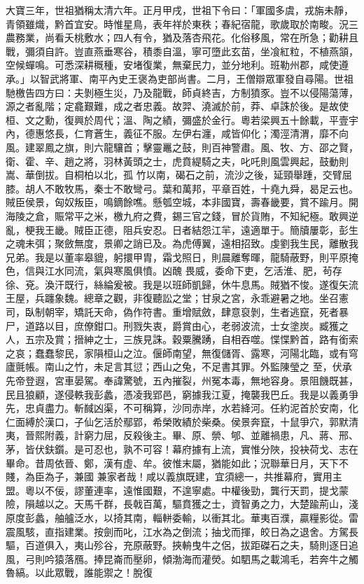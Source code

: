 \begin{pinyinscope}
 大寶三年，世祖猶稱太清六年。正月甲戌，世祖下令曰：「軍國多虞，戎旃未靜，青領雖熾，黔首宜安。時惟星鳥，表年祥於東秩；春紀宿龍，歌歲取於南畯。況三農務業，尚看夭桃敷水；四人有令，猶及落杏飛花。化俗移風，常在所急；勸耕且戰，彌須自許。豈直燕垂寒谷，積黍自溫，寧可墮此玄苗，坐飡紅粒，不植燕頷，空候蟬鳴。可悉深耕穊種，安堵復業，無棄民力，並分地利。班勒州郡，咸使遵
 承。」以智武將軍、南平內史王褒為吏部尚書。二月，王僧辯眾軍發自尋陽。世祖馳檄告四方曰：夫剝極生災，乃及龍戰，師貞終吉，方制獖豕。豈不以侵陽蕩薄，源之者亂階；定龕艱難，成之者忠義。故羿、澆滅於前，莽、卓誅於後。是故使桓、文之勳，復興於周代；溫、陶之績，彌盛於金行。粵若梁興五十餘載，平壹宇內，德惠悠長，仁育蒼生，義征不服。左伊右瀍，咸皆仰化；濁涇清渭，靡不向風。建翠鳳之旗，則六龍驤首；擊靈鼉之鼓，則百神警肅。風、牧、方、邵之賢，衛、霍、辛、趙之將，羽林黃頭之士，虎賁緹騎之夫，叱吒則風雲興起，鼓動則嵩、華倒拔。自桐柏以北，孤
 竹以南，碣石之前，流沙之後，延頸舉踵，交臂屈膝。胡人不敢牧馬，秦士不敢彎弓。葉和萬邦，平章百姓，十堯九舜，曷足云也。賊臣侯景，匈奴叛臣，鳴鏑餘噍。懸瓠空城，本非國寶，壽春畿要，賞不踰月。開海陵之倉，賑常平之米，檄九府之費，錫三官之錢，冒於貨賄，不知紀極。敢興逆亂，梗我王畿。賊臣正德，阻兵安忍。日者結怨江羋，遠適單于。簡牘屢彰，彭生之魂未弭；聚斂無度，景卿之誚已及。為虎傅翼，遠相招致。虔劉我生民，離散我兄弟。我是以董率皋貔，躬擐甲胄，霜戈照日，則晨離奪暉，龍騎蔽野，則平原掩色，信與江水同流，氣與寒風俱憤。凶醜
 畏威，委命下吏，乞活淮、肥，茍存徐、兗。渙汗既行，絲綸爰被。我是以班師凱歸，休牛息馬。賊猶不悛。遂復矢流王屋，兵躔象魏。總章之觀，非復聽訟之堂；甘泉之宮，永乖避暑之地。坐召憲司，臥制朝宰，矯託天命，偽作符書。重增賦斂，肆意裒剝，生者逃竄，死者暴尸，道路以目，庶僚鉗口。刑戮失衷，爵賞由心，老弱波流，士女塗炭。臧獲之人，五宗及賞；搢紳之士，三族見誅。穀粟騰踴，自相吞噬。惵惵黔首，路有銜索之哀；蠢蠢黎民，家隕桓山之泣。偃師南望，無復儲胥、露寒，河陽北臨，或有穹廬氈帳。南山之竹，未足言其愆；西山之兔，不足書其罪。外監陳瑩之
 至，伏承先帝登遐，宮車晏駕。奉諱驚號，五內摧裂，州冤本毒，無地容身。景阻饑既甚，民且狼顧，遂侵軼我彭蠡，憑凌我郢邑，窮據我江夏，掩襲我巴丘。我是以義勇爭先，忠貞盡力。斬馘凶渠，不可稱算，沙同赤岸，水若絳河。任約泥首於安南，化仁面縛於漢口，子仙乞活於鄢郢，希榮敗績於柴桑。侯景奔竄，十鼠爭穴，郭默清夷，晉熙附義，計窮力屈，反殺後主。畢、原、禜、郇、並離禍患，凡、蔣、邢、茅，皆伏鈇鑕。是可忍也，孰不可容！幕府據有上流，實惟分陜，投袂荷戈、志在畢命。昔周依晉、鄭，漢有虛、牟。彼惟末屬，猶能如此；況聯華日月，天下不賤，為臣為子，兼國
 兼家者哉！咸以義旗既建，宜須總一，共推幕府，實用主盟。粵以不佞，謬董連率，遠惟國艱，不遑寧處。中權後勁，龔行天罰，提戈蒙險，隕越以之。天馬千群，長戟百萬，驅賁獲之士，資智勇之力，大楚踰荊山，淺原度彭蠡，舳艫泛水，以掎其南，輜軿委輸，以衝其北。華夷百濮，贏糧影從。雷震風駭，直指建業。按劍而叱，江水為之倒流；抽戈而揮，皎日為之退舍。方駕長驅，百道俱入，夷山殄谷，充原蔽野。挾輈曳牛之侶，拔距磔石之夫，騎則逐日追風，弓則吟猿落鴈。捧昆崙而壓卵，傾渤海而灌熒。如駟馬之載鴻毛，若奔牛之觸魯縞。以此眾戰，誰能禦之！脫復

\end{pinyinscope}
